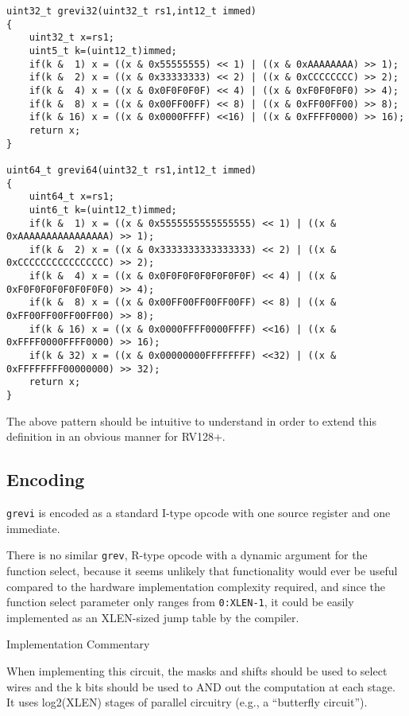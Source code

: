 \begin{verbatim}
uint32_t grevi32(uint32_t rs1,int12_t immed)
{
    uint32_t x=rs1;
    uint5_t k=(uint12_t)immed;
    if(k &  1) x = ((x & 0x55555555) << 1) | ((x & 0xAAAAAAAA) >> 1);
    if(k &  2) x = ((x & 0x33333333) << 2) | ((x & 0xCCCCCCCC) >> 2);
    if(k &  4) x = ((x & 0x0F0F0F0F) << 4) | ((x & 0xF0F0F0F0) >> 4);
    if(k &  8) x = ((x & 0x00FF00FF) << 8) | ((x & 0xFF00FF00) >> 8);
    if(k & 16) x = ((x & 0x0000FFFF) <<16) | ((x & 0xFFFF0000) >> 16);
    return x;
}

uint64_t grevi64(uint32_t rs1,int12_t immed)
{
    uint64_t x=rs1;
    uint6_t k=(uint12_t)immed;
    if(k &  1) x = ((x & 0x5555555555555555) << 1) | ((x & 0xAAAAAAAAAAAAAAAA) >> 1);
    if(k &  2) x = ((x & 0x3333333333333333) << 2) | ((x & 0xCCCCCCCCCCCCCCCC) >> 2);
    if(k &  4) x = ((x & 0x0F0F0F0F0F0F0F0F) << 4) | ((x & 0xF0F0F0F0F0F0F0F0) >> 4);
    if(k &  8) x = ((x & 0x00FF00FF00FF00FF) << 8) | ((x & 0xFF00FF00FF00FF00) >> 8);
    if(k & 16) x = ((x & 0x0000FFFF0000FFFF) <<16) | ((x & 0xFFFF0000FFFF0000) >> 16);
    if(k & 32) x = ((x & 0x00000000FFFFFFFF) <<32) | ((x & 0xFFFFFFFF00000000) >> 32);
    return x;
}
\end{verbatim}

The above pattern should be intuitive to understand in order to extend
this definition in an obvious manner for RV128+.

\subsection{Encoding}



\texttt{grevi} is encoded as a standard I-type opcode with one source
register and one immediate.

There is no similar \texttt{grev}, R-type opcode with a dynamic argument
for the function select, because it seems unlikely that functionality
would ever be useful compared to the hardware implementation complexity
required, and since the function select parameter only ranges from
\texttt{0:XLEN-1}, it could be easily implemented as an XLEN-sized jump
table by the compiler.

Implementation Commentary

When implementing this circuit, the masks and shifts should be used to
select wires and the k bits should be used to AND out the computation at
each stage. It uses log2(XLEN) stages of parallel circuitry (e.g., a
``butterfly circuit'').

